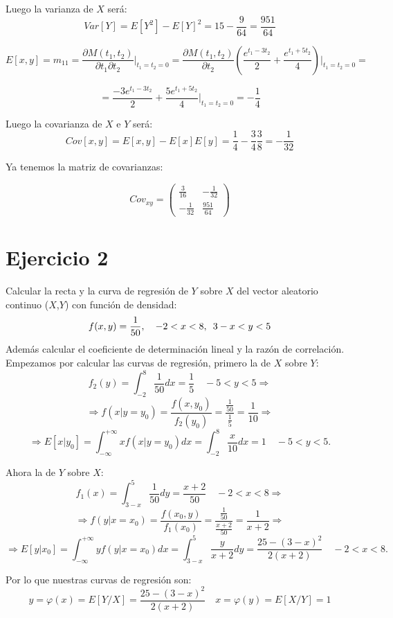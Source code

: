 \documentclass[a4paper, 11pt]{article}
\begin{document}
Luego la varianza de $X$ será: 
\[
Var[Y] = E[Y^2]-E[Y]^2=15-\frac{9}{64}=\frac{951}{64}
\]

\[
E[x,y]=m_{11}=\frac{\partial M(t_1, t_2)}{\partial t_1\partial t_2}\Big|_{t_1=t_2=0} = \frac{\partial M(t_1,t_2)}{\partial t_2}\left(\frac{e^{t_1-3t_2}}{2} + \frac{e^{t_1+5t_2}}{4}\right) \Big|_{t_1=t_2=0} = 
\]

\[
= \frac{-3e^{t_1-3t_2}}{2} + \frac{5e^{t_1+5t_2}}{4}  \Big|_{t_1=t_2=0} = -\frac{1}{4}
\]

Luego la covarianza de $X$ e $Y$ será:
\[
Cov[x,y]=E[x,y]-E[x]E[y]=\frac{1}{4}-\frac{3}{4}\frac{3}{8}=-\frac{1}{32}
\]

Ya tenemos la matriz de covarianzas:

\[
Cov_{xy} = \left( \begin{array}{cc}
\displaystyle\frac{3}{16} & -\displaystyle\frac{1}{32} \\
-\displaystyle\frac{1}{32} & \displaystyle\frac{951}{64}
\end{array} \right)
\]

\section*{Ejercicio 2}
Calcular la recta y la curva de regresión de $Y$ sobre $X$ del vector aleatorio continuo ($X$,$Y$) con función de densidad:
\[
f(x,y) = \frac{1}{50}, \quad -2<x<8, \enskip 3-x<y<5
\]
Además calcular el coeficiente de determinación lineal y la razón de correlación.\\[0.5cm]
Empezamos por calcular las curvas de regresión, primero la de $X$ sobre $Y$:
\[
f_2(y)=\int_{-2}^8\frac{1}{50}dx=\frac{1}{5} \quad -5<y<5 \Longrightarrow 
\]\[
\Longrightarrow f(x|y=y_0)=\frac{f(x,y_0)}{f_2(y_0)}= \frac{\frac{1}{50}}{\frac{1}{5}}=\frac{1}{10} \Longrightarrow
\]
\[
\Longrightarrow E[x|y_0]=\int_{-\infty}^{+\infty}xf(x|y=y_0)dx=\int_{-2}^{8}\frac{x}{10}dx=1 \quad -5<y<5.
\]

Ahora la de $Y$ sobre $X$:
\[
f_1(x)=\int_{3-x}^5\frac{1}{50}dy=\frac{x+2}{50} \quad -2<x<8 \Longrightarrow 
\]\[
\Longrightarrow f(y|x=x_0)=\frac{f(x_0,y)}{f_1(x_0)}= \frac{\frac{1}{50}}{\frac{x+2}{50}}=\frac{1}{x+2} \Longrightarrow
\]
\[
\Longrightarrow E[y|x_0]=\int_{-\infty}^{+\infty}yf(y|x=x_0)dx=\int_{3-x}^{5}\frac{y}{x+2}dy=\frac{25-(3-x)^2}{2(x+2)} \quad -2<x<8.
\]

Por lo que nuestras curvas de regresión son:
\[
y=\varphi(x)=E[Y/X]=\frac{25-(3-x)^2}{2(x+2)}  \quad x=\varphi(y)=E[X/Y]=1
\]
\end{document}

